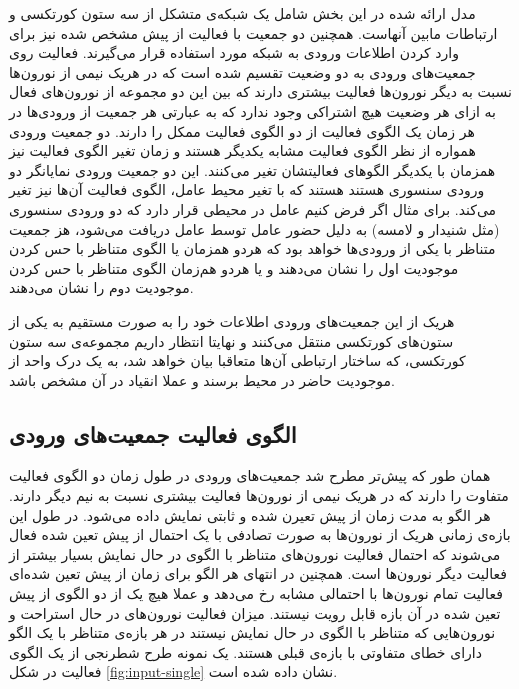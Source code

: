 \documentclass[12pt]{report}
\begin{document}
	مدل ارائه شده در این بخش شامل یک شبکه‌ی متشکل از سه ستون کورتکسی و ارتباطات مابین آنهاست. همچنین دو جمعیت با فعالیت از پیش مشخص شده نیز برای وارد کردن اطلاعات ورودی به شبکه مورد استفاده قرار می‌گیرند. فعالیت روی جمعیت‌های ورودی به دو وضعیت تقسیم شده است که در هریک نیمی از نورون‌ها نسبت به دیگر نورون‌ها فعالیت بیشتری دارند که بین این دو مجموعه از نورون‌های فعال به ازای هر وضعیت هیچ اشتراکی وجود ندارد که به عبارتی هر جمعیت از ورودی‌ها در هر زمان یک الگوی فعالیت از دو الگوی فعالیت ممکل را دارند. دو جمعیت ورودی همواره از نظر الگوی فعالیت مشابه یکدیگر هستند و زمان تغیر الگوی فعالیت نیز همزمان با یکدیگر الگو‌های فعالیتشان تغیر می‌کنند. این دو جمعیت ورودی نمایانگر دو ورودی سنسوری هستند هستند که با تغیر محیط عامل، الگوی فعالیت آن‌ها نیز تغیر می‌کند. برای مثال اگر فرض کنیم عامل در محیطی قرار دارد که دو ورودی سنسوری (مثل شنیدار و لامسه) به دلیل حضور عامل توسط عامل دریافت می‌شود، هز جمعیت متناظر با یکی از ورودی‌ها خواهد بود که هردو همزمان یا الگوی متناظر با حس کردن موجودیت اول را نشان‌ می‌دهند و یا هردو هم‌زمان الگوی متناظر با حس کردن موجودیت دوم را نشان می‌دهند.
	
	هریک از این جمعیت‌های ورودی اطلاعات خود‌ را به صورت مستقیم به یکی از ستون‌های کورتکسی منتقل می‌کنند و نهایتا انتظار داریم مجموعه‌ی سه ستون کورتکسی، که ساختار ارتباطی آن‌ها متعاقبا بیان خواهد شد، به یک درک واحد از موجودیت حاضر در محیط برسند و عملا انقیاد در آن مشخص باشد.
	
	
	\subsection{الگوی فعالیت جمعیت‌های ورودی}
	
	همان طور که پیش‌تر مطرح شد جمعیت‌های ورودی در طول زمان دو الگوی فعالیت متفاوت را دارند که در هر‌یک نیمی از نورون‌ها فعالیت بیشتری نسبت به نیم دیگر دارند. هر الگو به مدت زمان از پیش تعیرن شده و ثابتی نمایش داده می‌شود. در طول این بازه‌ی زمانی هریک از نورون‌ها به صورت تصادفی با یک احتمال از پیش تعین شده فعال می‌شوند که احتمال فعالیت نورون‌های متناظر با الگوی در حال نمایش بسیار بیشتر از فعالیت دیگر نورون‌ها است. همچنین در انتهای هر الگو برای زمان از پیش تعین شده‌ای فعالیت تمام نورون‌ها با احتمالی مشابه رخ می‌دهد  و عملا هیچ یک از دو الگوی از پیش تعین شده در آن بازه قابل رویت نیستند. میزان فعالیت نورون‌های در حال استراحت و نورون‌هایی که متناظر با الگوی در حال نمایش نیستند در هر بازه‌ی متناظر با یک الگو دارای خطای متفاوتی با بازه‌ی قبلی هستند. یک نمونه طرح شطرنجی از یک الگوی فعالیت در شکل \ref{fig:input-single} نشان داده شده است.
	
\end{document}
